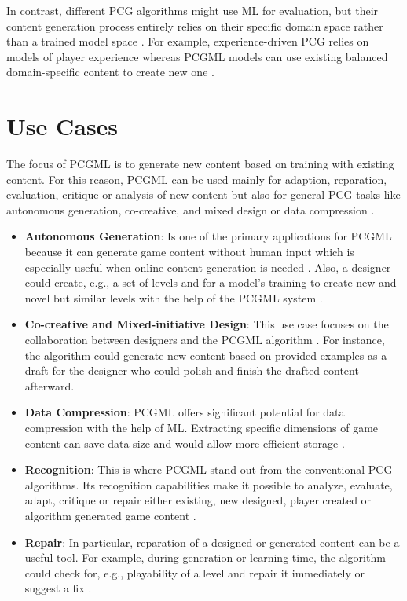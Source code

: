 \documentclass[MGS,Master,english]{twbook}%
\begin{document}
In contrast, different PCG algorithms might use ML for evaluation, but their content generation process entirely relies on their specific domain space rather than a trained model space \cite{pcgml::paper}. For example, experience-driven PCG relies on models of player experience whereas PCGML models can use existing balanced domain-specific content to create new one \cite{pcgml::paper}.

\section{Use Cases}
The focus of PCGML is to generate new content based on training with existing content. For this reason, PCGML can be used mainly for adaption, reparation, evaluation, critique or analysis of new content but also for general PCG tasks like autonomous generation, co-creative, and mixed design or data compression \cite{pcgml::paper}.
\begin{itemize}
	\item \textbf{Autonomous Generation}: Is one of the primary applications for PCGML because it can generate game content without human input which is especially useful when online content generation is needed \cite{pcgml::paper}. Also, a designer could create, e.g., a set of levels and for a model's training to create new and novel but similar levels with the help of the PCGML system \cite{pcgml::paper}.
	\item \textbf{Co-creative and Mixed-initiative Design}: This use case focuses on the collaboration between designers and the PCGML algorithm \cite{pcgml::paper}. For instance, the algorithm could generate new content based on provided examples as a draft for the designer who could polish and finish the drafted content afterward.
	\item \textbf{Data Compression}: PCGML offers significant potential for data compression with the help of ML. Extracting specific dimensions of game content can save data size and would allow more efficient storage \cite{pcgml::paper}.
	\item \textbf{Recognition}: This is where PCGML stand out from the conventional PCG algorithms. Its  recognition capabilities make it possible to analyze, evaluate, adapt, critique or repair either existing, new designed, player created or algorithm generated game content \cite{pcgml::paper}. 
	\item \textbf{Repair}: In particular, reparation of a designed or generated content can be a useful tool. For example, during generation or learning time, the algorithm could check for, e.g., playability of a level and repair it immediately or suggest a fix \cite{pcgml::paper}.
\end{itemize}
\end{document}
